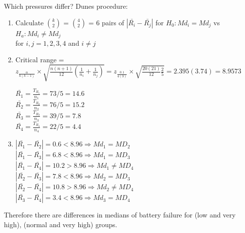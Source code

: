 \documentclass{article}
\begin{document}
\begin{enumerate}[1.]
Which pressures differ? Dunes procedure:

\begin{enumerate}[1)]
\item
Calculate $k \choose 2$ = $4 \choose 2$ = 6 pairs of $|\bar{R_i} - \bar{R_j}|$ for $H_0: Md_i = Md_j$ vs $H_a: Md_i \neq Md_j$ \\
for $i,j = 1,2,3,4$ and $i \neq j$

\item 
Critical range = $z_{\frac{\alpha}{k(k-1)}} \times \sqrt{ \frac{n(n+1)}{12}( \frac{1}{n_i} + \frac{1}{n_j} )} = z_{\frac{0.1}{4(3)}} \times \sqrt{ \frac{20(21)}{12}\frac{2}{5}} = 2.395(3.74) = 8.9573$

$\bar{R_1} = \frac{T_{R_1}}{n_1} = 73/5 = 14.6$ \\
$\bar{R_2} = \frac{T_{R_2}}{n_2} = 76/5 = 15.2$ \\
$\bar{R_3} = \frac{T_{R_3}}{n_3} = 39/5 = 7.8$ \\ 
$\bar{R_4} = \frac{T_{R_4}}{n_4} = 22/5 = 4.4$\\ 

\item
$|\bar{R_1} - \bar{R_2}| = 0.6 < 8.96 \Rightarrow Md_1 = MD_2$ \\
$|\bar{R_1} - \bar{R_3}| = 6.8 < 8.96 \Rightarrow Md_1 = MD_3$ \\
$|\bar{R_1} - \bar{R_4}| = 10.2 > 8.96 \Rightarrow Md_1 \neq MD_4$ \\

$|\bar{R_2} - \bar{R_3}| = 7.8 < 8.96 \Rightarrow Md_2 = MD_3$ \\
$|\bar{R_2} - \bar{R_4}| = 10.8 > 8.96 \Rightarrow Md_2 \neq MD_4$ \\

$|\bar{R_3} - \bar{R_4}| = 3.4 < 8.96 \Rightarrow Md_3 = MD_4$ \\

\end{enumerate}

Therefore there are differences in medians of battery failure for (low and very high), (normal and very high) groups.



\end{enumerate}
\end{document}
